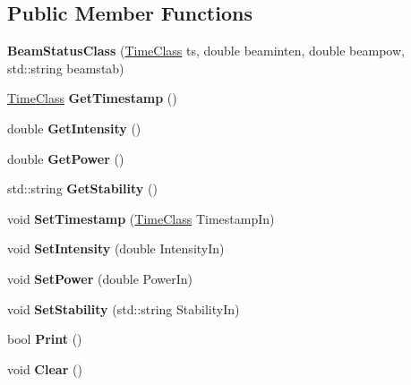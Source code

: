 \subsection*{Public Member Functions}
\begin{DoxyCompactItemize}
\item 
\hypertarget{classBeamStatusClass_a16f64e35b4c0c7fb4565b930393cf0dc}{
{\bfseries BeamStatusClass} (\hyperlink{classTimeClass}{TimeClass} ts, double beaminten, double beampow, std::string beamstab)}
\label{classBeamStatusClass_a16f64e35b4c0c7fb4565b930393cf0dc}

\item 
\hypertarget{classBeamStatusClass_a3099faed7d12197a62ee27dacee0d32d}{
\hyperlink{classTimeClass}{TimeClass} {\bfseries GetTimestamp} ()}
\label{classBeamStatusClass_a3099faed7d12197a62ee27dacee0d32d}

\item 
\hypertarget{classBeamStatusClass_aee60c7ca2561a801cb80d6c239ca2189}{
double {\bfseries GetIntensity} ()}
\label{classBeamStatusClass_aee60c7ca2561a801cb80d6c239ca2189}

\item 
\hypertarget{classBeamStatusClass_abf408e07c997e60b084dc613d5fda75c}{
double {\bfseries GetPower} ()}
\label{classBeamStatusClass_abf408e07c997e60b084dc613d5fda75c}

\item 
\hypertarget{classBeamStatusClass_a052d6ca339a0ca531de200a6cb790fad}{
std::string {\bfseries GetStability} ()}
\label{classBeamStatusClass_a052d6ca339a0ca531de200a6cb790fad}

\item 
\hypertarget{classBeamStatusClass_a26f08683ffd71565d38714886b130459}{
void {\bfseries SetTimestamp} (\hyperlink{classTimeClass}{TimeClass} TimestampIn)}
\label{classBeamStatusClass_a26f08683ffd71565d38714886b130459}

\item 
\hypertarget{classBeamStatusClass_a6ad6d7fe6847a45a043115f6b452ce4a}{
void {\bfseries SetIntensity} (double IntensityIn)}
\label{classBeamStatusClass_a6ad6d7fe6847a45a043115f6b452ce4a}

\item 
\hypertarget{classBeamStatusClass_a93db8cf0576994acb051c0c17d714e13}{
void {\bfseries SetPower} (double PowerIn)}
\label{classBeamStatusClass_a93db8cf0576994acb051c0c17d714e13}

\item 
\hypertarget{classBeamStatusClass_a4bae86f8f8d6ab9b74dbe73f456a97c6}{
void {\bfseries SetStability} (std::string StabilityIn)}
\label{classBeamStatusClass_a4bae86f8f8d6ab9b74dbe73f456a97c6}

\item 
\hypertarget{classBeamStatusClass_a5a45cde713baaa1d205b0311c7a3ec23}{
bool {\bfseries Print} ()}
\label{classBeamStatusClass_a5a45cde713baaa1d205b0311c7a3ec23}

\item 
\hypertarget{classBeamStatusClass_a8b86d3c481eab24e6c8a2fda5940d7d8}{
void {\bfseries Clear} ()}
\label{classBeamStatusClass_a8b86d3c481eab24e6c8a2fda5940d7d8}

\end{DoxyCompactItemize}
